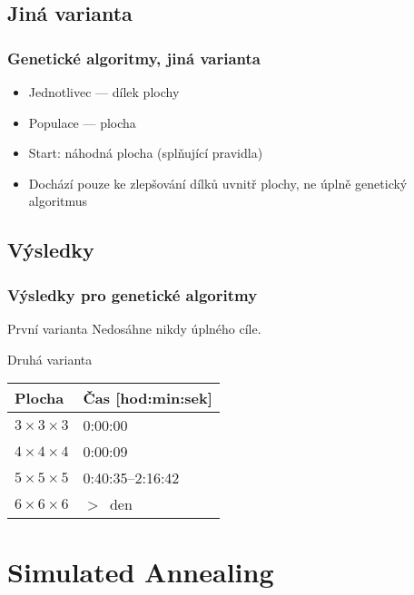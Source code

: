 \documentclass{beamer}
\begin{document}
\subsection{Jiná varianta}

\begin{frame}
\frametitle{Genetické algoritmy, jiná varianta}

\begin{itemize}
\item Jednotlivec --- dílek plochy
\item Populace --- plocha
\item Start: náhodná plocha (splňující pravidla)
\item Dochází pouze ke zlepšování dílků uvnitř plochy, ne úplně genetický algoritmus
\end{itemize}

\end{frame}


\subsection{Výsledky}

\begin{frame}
\frametitle{Výsledky pro genetické algoritmy}

\begin{block}{První varianta}
Nedosáhne nikdy úplného cíle.
\end{block}

\begin{block}{Druhá varianta}
\centering
\begin{tabular}{|l|l|}
\hline
\textbf{Plocha} & \textbf{Čas [hod:min:sek]} \\
\hline
$3 \times 3 \times 3$ & 0:00:00 \\
$4 \times 4 \times 4$ & 0:00:09 \\
$5 \times 5 \times 5$ & 0:40:35--2:16:42 \\
$6 \times 6 \times 6$ & $>$~den \\
\hline
\end{tabular}
\end{block}

\end{frame}


\section{Simulated Annealing}
\end{document}
